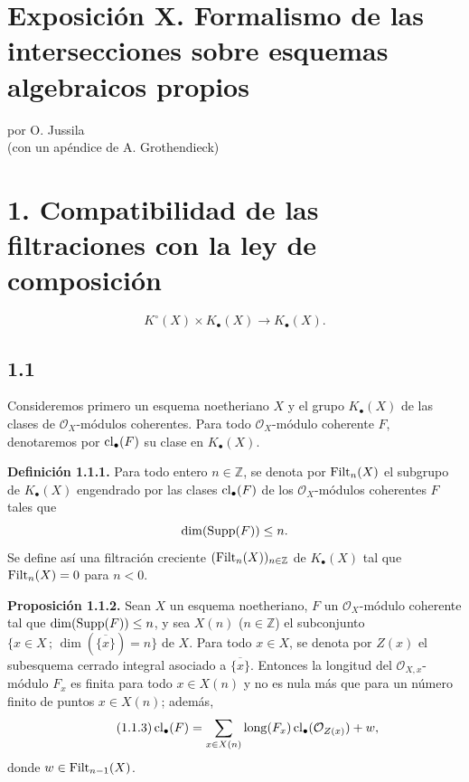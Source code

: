 \providecommand{\sisi}[2]{#2}

\section*{Exposición X. Formalismo de las intersecciones sobre esquemas algebraicos propios}
\begin{center}
por O. Jussila\\
(con un apéndice de A. Grothendieck)
\end{center}

\section*{1. Compatibilidad de las filtraciones con la ley de composición}
\[
K^\circ(X)\times K_\bullet(X)\longrightarrow K_\bullet(X).
\]

\subsection*{1.1}
Consideremos primero un esquema noetheriano $X$ y el grupo $K_\bullet(X)$ de
las clases de $\mathcal O_X$-módulos coherentes. Para todo $\mathcal O_X$-módulo
coherente $F$, denotaremos por $\operatorname{cl}_\bullet(F)$ su clase en $K_\bullet(X)$.

\textbf{Definición 1.1.1.}
Para todo entero $n\in\mathbb Z$, se denota por $\operatorname{Filt}_n(X)$ el subgrupo de
$K_\bullet(X)$ engendrado por las clases $\operatorname{cl}_\bullet(F)$ de los
$\mathcal O_X$-módulos coherentes $F$ tales que
\[
\dim(\operatorname{Supp}(F))\leq n.
\]
Se define así una filtración creciente $(\operatorname{Filt}_n(X))_{n\in\mathbb Z}$ de
$K_\bullet(X)$ tal que $\operatorname{Filt}_n(X)=0$ para $n<0$.

\textbf{Proposición 1.1.2.}
Sean $X$ un esquema noetheriano, $F$ un $\mathcal O_X$-módulo coherente tal
que $\dim(\operatorname{Supp}(F))\leq n$, y sea $X(n)$ ($n\in\mathbb Z$) el subconjunto
$\{x\in X\,;\,\dim(\overline{\{x\}})=n\}$ de $X$. Para todo $x\in X$, se denota por $Z(x)$ el subesquema cerrado
integral asociado a $\overline{\{x\}}$. Entonces la longitud del
$\mathcal O_{X,x}$-módulo $F_x$ es finita para todo $x\in X(n)$ y no es nula
más que para un número finito de puntos $x\in X(n)$; además,
\begin{equation}\tag{1.1.3}
\operatorname{cl}_\bullet(F)=
\sum_{x\in X(n)}\operatorname{long}(F_x)\operatorname{cl}_\bullet(\mathcal O_{Z(x)})+w,
\end{equation}
donde $w\in\operatorname{Filt}_{n-1}(X)$.

